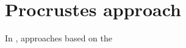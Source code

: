 \section{Procrustes approach}
\label{sec2_5:sec_procrutes_approach}

In \cite{mariana2019}, approaches based on the